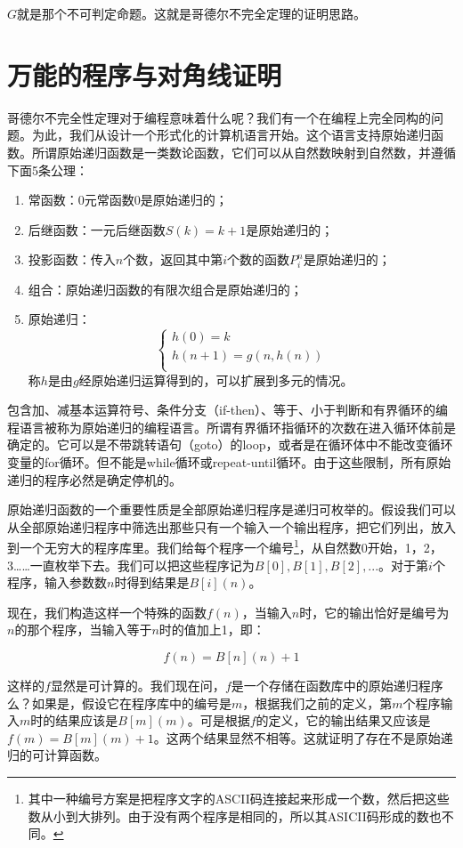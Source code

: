 \documentclass{article}
\begin{document}
$G$就是那个不可判定命题。这就是哥德尔不完全定理的证明思路。

\section{万能的程序与对角线证明}
哥德尔不完全性定理对于编程意味着什么呢？我们有一个在编程上完全同构的问题。为此，我们从设计一个形式化的计算机语言开始。这个语言支持原始递归函数。所谓原始递归函数是一类数论函数，它们可以从自然数映射到自然数，并遵循下面5条公理：

\begin{enumerate}
\item 常函数：0元常函数0是原始递归的；
\item 后继函数：一元后继函数$S(k) = k + 1$是原始递归的；
\item 投影函数：传入$n$个数，返回其中第$i$个数的函数$P_i^n$是原始递归的；
\item 组合：原始递归函数的有限次组合是原始递归的；
\item 原始递归：
\[
\begin{cases}
h(0) = k \\
h(n + 1) = g(n, h(n)) \\
\end{cases}
\]
称$h$是由$g$经原始递归运算得到的，可以扩展到多元的情况。
\end{enumerate}

包含加、减基本运算符号、条件分支（if-then）、等于、小于判断和有界循环的编程语言被称为原始递归的编程语言。所谓有界循环指循环的次数在进入循环体前是确定的。它可以是不带跳转语句（goto）的loop，或者是在循环体中不能改变循环变量的for循环。但不能是while循环或repeat-until循环。由于这些限制，所有原始递归的程序必然是确定停机的。

原始递归函数的一个重要性质是全部原始递归程序是递归可枚举的。假设我们可以从全部原始递归程序中筛选出那些只有一个输入一个输出程序，把它们列出，放入到一个无穷大的程序库里。我们给每个程序一个编号\footnote{其中一种编号方案是把程序文字的ASCII码连接起来形成一个数，然后把这些数从小到大排列。由于没有两个程序是相同的，所以其ASICII码形成的数也不同。}，从自然数0开始，1，2，3……一直枚举下去。我们可以把这些程序记为$B[0], B[1], B[2], ...$。对于第$i$个程序，输入参数数$n$时得到结果是$B[i](n)$。

现在，我们构造这样一个特殊的函数$f(n)$，当输入$n$时，它的输出恰好是编号为$n$的那个程序，当输入等于$n$时的值加上1，即：

\[
f(n) = B[n](n) + 1
\]

这样的$f$显然是可计算的。我们现在问，$f$是一个存储在函数库中的原始递归程序么？如果是，假设它在程序库中的编号是$m$，根据我们之前的定义，第$m$个程序输入$m$时的结果应该是$B[m](m)$。可是根据$f$的定义，它的输出结果又应该是$f(m) = B[m](m) + 1$。这两个结果显然不相等。这就证明了存在不是原始递归的可计算函数。
\end{document}

